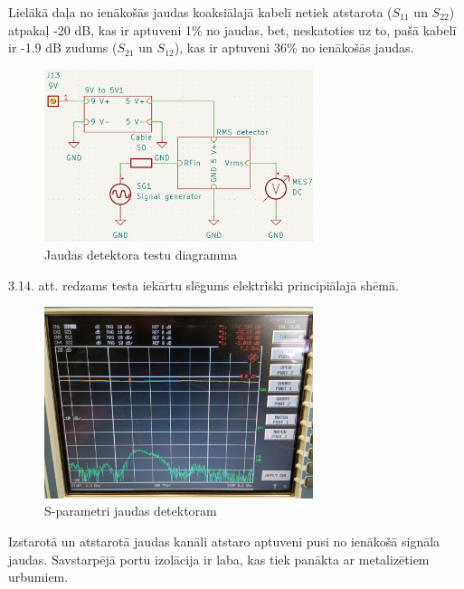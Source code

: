 Lielākā daļa no ienākošās jaudas koaksiālajā kabelī netiek atstarota ($S_{11}$ un $S_{22}$) atpakaļ -20 dB, kas ir aptuveni 1\% no jaudas, bet, neskatoties uz to, pašā kabelī ir -1.9 dB zudums ($S_{21}$ un $S_{12}$), kas ir aptuveni 36\% no ienākošās jaudas.
\begin{figure}[H]
	\centering
    \includegraphics[width=0.7\textwidth]{pictures/tests_diagram3.png}\hspace{1cm}
    \caption{Jaudas detektora testu diagramma}
\end{figure}
3.14. att. redzams testa iekārtu slēgums elektriski principiālajā shēmā.
\begin{figure}[H]
	\centering
    \includegraphics[width=0.7\textwidth]{pictures/vna_measurement_powerdet.jpeg}\hspace{1cm}
    \caption{S-parametri jaudas detektoram}
\end{figure}
Izstarotā un atstarotā jaudas kanāli atstaro aptuveni pusi no ienākošā signāla jaudas. Savstarpējā portu izolācija ir laba, kas tiek panākta ar metalizētiem urbumiem.
